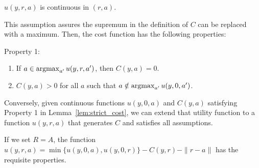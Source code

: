 \documentclass[11pt]{elegantbook}
\newcommand{\argmax}{\operatornamewithlimits{argmax}}
\begin{document}
\begin{assumption}[Continunity]
    $u(y,r,a)$ is continuous in $(r,a)$.
\end{assumption}
This assumption assures the supremum in the definition
of $C$ can be replaced with a maximum. Then, the cost function has the following properties:
\begin{lemma}\label{lem:strict_cost}
    Property 1:
    \begin{enumerate}
        \item If $a\in\argmax_{a'}u(y,r,a')$, then $C(y,a)=0$.
        \item $C(y,a)>0$ for all $a$ such that $a\notin\argmax_{a'}u(y,0,a')$.
    \end{enumerate}
\end{lemma}
Conversely, given continuous functions $u(y,0,a)$ and $C(y,a)$ satisfying Property 1 in Lemma~\ref{lem:strict_cost}, we can extend that utility function to a function $u(y,r,a)$ that generates $C$ and satisfies all assumptions.
\begin{example}
    If we set $R=A$, the function $u(y,r,a)=\min\{u(y,0,a),u(y,0,r)\}-C(y,r)-\|r-a\|$ has the requisite properties.
\end{example}





































































\end{document}
